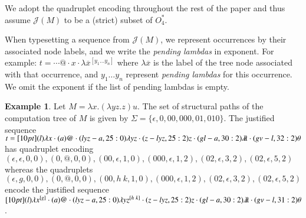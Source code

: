 \documentclass{elsarticle}
\theoremstyle{plain}
\theoremstyle{definition}
\newtheorem{example}{Example}[section]
\theoremstyle{remark}
\newcommand{\ghostlmd}{{\lambda\!\!\lambda}}
\newcommand{\ghostvar}{\theta}
\def\justseqset{\mathcal{J}}
\begin{document}
We adopt the quadruplet encoding throughout the rest of the paper and thus assume $\justseqset(M)$ to be a (strict) subset of $O_4^*$.




 When typesetting a sequence from $\justseqset(M)$, we represent occurrences by their associated node labels, and we write the \emph{pending lambdas} in exponent. For example:
$t = \cdots @ \cdot x \cdot \lambda\overline{x}^{[y_1 \ldots y_n]}$
where $\lambda\overline{x}$ is the label of the tree node associated with that occurrence, and $y_1 \ldots y_n$ represent \emph{pending lambdas} for this occurrence. We omit the exponent if the list of pending lambdas is empty.

\begin{example}
\label{examp:ghost_materialization}
    Let $M = \lambda x. (\lambda y z.z) u$. The set of structural paths of the computation tree of $M$ is given by $\Sigma = \{\epsilon, 0, 00,000, 01,010\}$. The justified sequence
    $t = \Pstr[10pt]{
        (l){\lambda x} \cdot (a)@ \cdot (lyz-a,25:0){\lambda y z} \cdot (z-lyz,25:2)z \cdot (gl-a,30:2)\ghostlmd \cdot (gv-l,32:2)\ghostvar }
    $
    has quadruplet encoding
    $(\epsilon, \epsilon ,0,0), (0,@,0,0), (00, \epsilon, 1,0), (000,\epsilon, 1,2), (02,\epsilon,3,2), (02,\epsilon,5,2) $ whereas the quadruplets $ (\epsilon, g ,0,0), (0,@,0,0), (00, h~k, 1,0), (000,\epsilon, 1,2), (02,\epsilon,3,2), (02,\epsilon,5,2) $ encode the justified sequence
    $\Pstr[10pt]{
        (l){\lambda x^{[g]}} \cdot (a)@ \cdot (lyz-a,25:0){\lambda y z^{[h~k]}} \cdot (z-lyz,25:2)z \cdot (gl-a,30:2)\ghostlmd \cdot (gv-l,31:2)\ghostvar }
    $.
\end{example}
\end{document}
